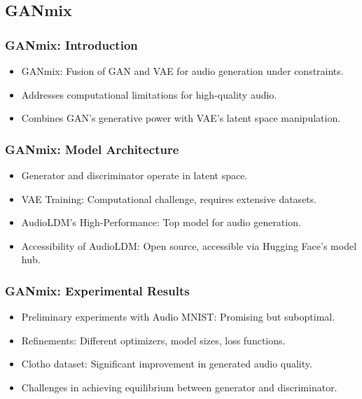 \subsection{GANmix}

\begin{frame}
    \frametitle{GANmix: Introduction}

    \begin{itemize}
        \item GANmix: Fusion of GAN and VAE for audio generation under constraints.
        \item Addresses computational limitations for high-quality audio.
        \item Combines GAN's generative power with VAE's latent space manipulation.
    \end{itemize}
\end{frame}

\begin{frame}
    \frametitle{GANmix: Model Architecture}

    \begin{itemize}
        \item Generator and discriminator operate in latent space.
        \item VAE Training: Computational challenge, requires extensive datasets.
        \item AudioLDM's High-Performance: Top model for audio generation.
        \item Accessibility of AudioLDM: Open source, accessible via Hugging Face's model hub.
    \end{itemize}
\end{frame}

\begin{frame}
    \frametitle{GANmix: Experimental Results}

    \begin{itemize}
        \item Preliminary experiments with Audio MNIST: Promising but suboptimal.
        \item Refinements: Different optimizers, model sizes, loss functions.
        \item Clotho dataset: Significant improvement in generated audio quality.
        \item Challenges in achieving equilibrium between generator and discriminator.
    \end{itemize}
\end{frame}


